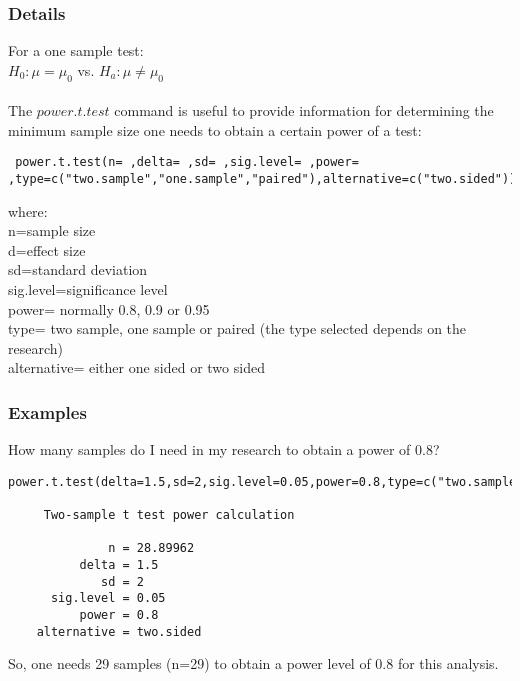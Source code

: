 \documentclass[12pt,a4paper]{article}
\theoremstyle{regla}
\theoremstyle{remark}
\theoremstyle{definition}
\theoremstyle{nonumberbreak}
\begin{document}
\subsubsection{Details}
For a one sample test:\\
$H_0: \mu=\mu_0$ vs. $H_a:\mu\neq\mu_0$\\
\\
The $power.t.test$ command is useful to provide information for determining the minimum sample size one needs to obtain a certain power of a test:
\begin{lstlisting}
 power.t.test(n= ,delta= ,sd= ,sig.level= ,power= ,type=c("two.sample","one.sample","paired"),alternative=c("two.sided"))
\end{lstlisting}
where:\\
n=sample size\\
d=effect size\\
sd=standard deviation\\
sig.level=significance level\\
power= normally 0.8, 0.9 or 0.95 \\
type= two sample, one sample or paired (the type selected depends on the research)\\
alternative= either one sided or two sided\\
\subsubsection{Examples}
\begin{xmpl}
How many samples do I need in my research to obtain a power of 0.8?
\begin{lstlisting}
power.t.test(delta=1.5,sd=2,sig.level=0.05,power=0.8,type=c("two.sample"),alternative=c("two.sided"))

     Two-sample t test power calculation 

              n = 28.89962
          delta = 1.5
             sd = 2
      sig.level = 0.05
          power = 0.8
    alternative = two.sided

\end{lstlisting}
So, one needs 29 samples (n=29) to obtain a power level of 0.8 for this analysis.
\end{xmpl}

\end{document}
